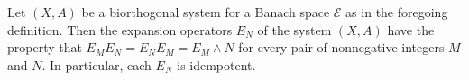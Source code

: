 Let $(X, A)$ be a biorthogonal system for a Banach space $\mathcal{E}$ as in the foregoing definition. Then the expansion operators $E_N$ of the system $(X, A)$ have the property that $E_M E_N = E_N E_M = E_M \wedge N$ for every pair of nonnegative integers $M$ and $N$. In particular, each $E_N$ is idempotent.

